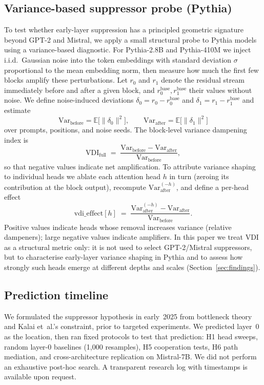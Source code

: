 \subsection{Variance-based suppressor probe (Pythia)}\label{sec:methods-vdi}
To test whether early-layer suppression has a principled geometric signature beyond GPT-2 and Mistral, we apply a small structural probe to Pythia models using a variance-based diagnostic.
For Pythia-2.8B and Pythia-410M we inject i.i.d.\ Gaussian noise into the token embeddings with standard deviation $\sigma$ proportional to the mean embedding norm, then measure how much the first few blocks amplify these perturbations.
Let $r_0$ and $r_1$ denote the residual stream immediately before and after a given block, and $r_0^{\mathrm{base}}, r_1^{\mathrm{base}}$ their values without noise.
We define noise-induced deviations $\delta_0 = r_0 - r_0^{\mathrm{base}}$ and $\delta_1 = r_1 - r_1^{\mathrm{base}}$ and estimate
\[
  \mathrm{Var}_\text{before} = \mathbb{E}\big[\lVert \delta_0\rVert^2\big], \qquad
  \mathrm{Var}_\text{after} = \mathbb{E}\big[\lVert \delta_1\rVert^2\big]
\]
over prompts, positions, and noise seeds.
The block-level variance dampening index is
\[
  \mathrm{VDI}_\text{full} \;=\; \frac{\mathrm{Var}_\text{before} - \mathrm{Var}_\text{after}}{\mathrm{Var}_\text{before}},
\]
so that negative values indicate net amplification.
To attribute variance shaping to individual heads we ablate each attention head $h$ in turn (zeroing its contribution at the block output), recompute $\mathrm{Var}_\text{after}^{(-h)}$, and define a per-head effect
\[
  \mathrm{vdi\_effect}[h] \;=\; \frac{\mathrm{Var}_\text{after}^{(-h)} - \mathrm{Var}_\text{after}}{\mathrm{Var}_\text{before}}.
\]
Positive values indicate heads whose removal increases variance (relative dampeners); large negative values indicate amplifiers.
In this paper we treat VDI as a structural metric only: it is not used to select GPT-2/Mistral suppressors, but to characterise early-layer variance shaping in Pythia and to assess how strongly such heads emerge at different depths and scales (Section~\ref{sec:findings}).

\subsection{Prediction timeline}\label{sec:timeline}
We formulated the suppressor hypothesis in early~2025 from bottleneck theory and Kalai et~al.'s constraint, prior to targeted experiments. We predicted layer~0 as the location, then ran fixed protocols to test that prediction: H1 head sweeps, random layer-0 baselines (1{,}000 resamples), H5 cooperation tests, H6 path mediation, and cross-architecture replication on Mistral-7B. We did not perform an exhaustive post-hoc search. A transparent research log with timestamps is available upon request.

